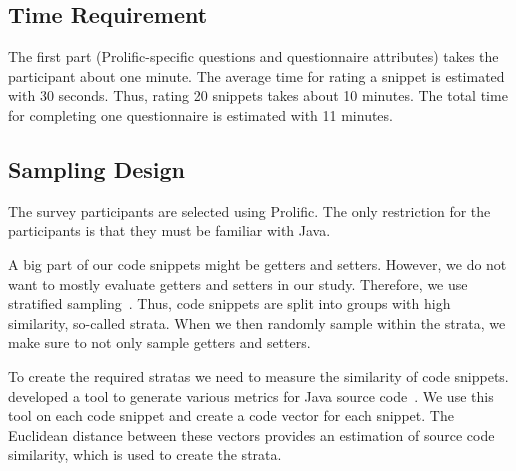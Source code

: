 \documentclass[%
class=scrreprt,
chapterprefix=false,%
open=right,%
twoside=false,%
paper=a4,%
logofile={Logo\_zentral\_farbig\_EN.png},%
thesistype=masterproposal,%
UKenglish,%
]{se2thesis}
\begin{document}

\subsection{Time Requirement}
The first part (Prolific-specific questions and questionnaire attributes) takes the participant about one minute. The average time for rating a snippet is estimated with 30 seconds. Thus, rating 20 snippets takes about 10 minutes. The total time for completing one questionnaire is estimated with 11 minutes.

\subsection{Sampling Design}
The survey participants are selected using Prolific. The only restriction for the participants is that they must be familiar with Java.

A big part of our code snippets might be getters and setters. However, we do not want to mostly evaluate getters and setters in our study. Therefore, we use stratified sampling~\cite{thompson2012sampling}. Thus, code snippets are split into groups with high similarity, so-called strata. When we then randomly sample within the strata, we make sure to not only sample getters and setters.

To create the required stratas we need to measure the similarity of code snippets. \citeauthor{scalabrino2016improving} developed a tool to generate various metrics for Java source code~\cite{scalabrino2016improving}. We use this tool on each code snippet and create a code vector for each snippet. The Euclidean distance between these vectors provides an estimation of source code similarity, which is used to create the strata.
\end{document}
